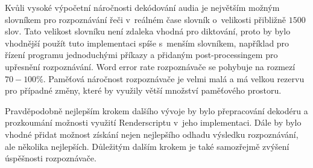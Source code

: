 Kvůli vysoké výpočetní náročnosti dekódování audia je největším možným slovníkem pro rozpoznávání řeči v~reálném čase slovník o~velikosti přibližně $1500$ slov. Tato velikost slovníku není zdaleka vhodná pro diktování, proto by bylo vhodnější použít tuto implementaci spíše s~menším slovníkem, například pro řízení programu jednoduchými příkazy a přidaným post-processingem pro upřesnění rozpoznávání. Word error rate rozpoznávače se pohybuje na rozmezí $70-100\%$. Paměťová náročnost rozpoznávače je velmi malá a má velkou rezervu pro případné změny, které by využily větší množství paměťového prostoru.

Pravděpodobně nejlepším krokem dalšího vývoje by bylo přepracování dekodéru a prozkoumání možnosti využití Renderscriptu v~jeho implementaci. Dále by bylo vhodné přidat možnost získání nejen nejlepšího odhadu výsledku rozpoznávání, ale několika nejlepších. Důležitým dalším krokem je také samozřejmě zvýšení úspěšnosti rozpoznávače.
